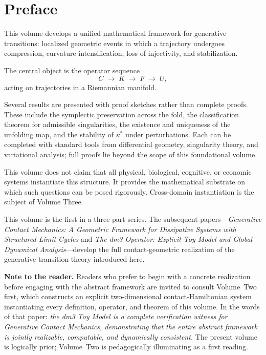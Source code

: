 \documentclass[12pt, oneside]{book}
\theoremstyle{plain}
\theoremstyle{definition}
\theoremstyle{remark}
\begin{document}
\section*{Preface}

This volume develops a unified mathematical framework for generative
transitions: localized geometric events in which a trajectory undergoes
compression, curvature intensification, loss of injectivity, and
stabilization.

The central object is the operator sequence
\[
C \;\rightarrow\; K \;\rightarrow\; F \;\rightarrow\; U,
\]
acting on trajectories in a Riemannian manifold.

Several results are presented with proof sketches rather than complete
proofs. These include the symplectic preservation across the fold, the
classification theorem for admissible singularities, the existence and
uniqueness of the unfolding map, and the stability of $\kappa^*$ under
perturbations. Each can be completed with standard tools from
differential geometry, singularity theory, and variational analysis;
full proofs lie beyond the scope of this foundational volume.

This volume does not claim that all physical, biological, cognitive,
or economic systems instantiate this structure. It provides the
mathematical substrate on which such questions can be posed rigorously.
Cross-domain instantiation is the subject of Volume Three.

This volume is the first in a three-part series. The subsequent
papers---\emph{Generative Contact Mechanics: A Geometric Framework for
Dissipative Systems with Structured Limit Cycles} and \emph{The dm3
Operator: Explicit Toy Model and Global Dynamical Analysis}---develop
the full contact-geometric realization of the generative transition
theory introduced here.

\medskip

\noindent\textbf{Note to the reader.}
Readers who prefer to begin with a concrete realization before
engaging with the abstract framework are invited to consult
Volume~Two first, which constructs an explicit two-dimensional
contact-Hamiltonian system instantiating every definition, operator,
and theorem of this volume. In the words of that paper:
\emph{the dm3 Toy Model is a complete verification witness for
Generative Contact Mechanics, demonstrating that the entire abstract
framework is jointly realizable, computable, and dynamically consistent.}
The present volume is logically prior; Volume~Two is pedagogically
illuminating as a first reading.
\end{document}
